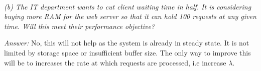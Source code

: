 \documentclass[12pt]{article}
\newenvironment{QandA}{\begin{enumerate}[label=\bfseries\alph*.]\bfseries}
                      {\end{enumerate}}
\newenvironment{answered}{\par\quad\normalfont}{}
\begin{document}
\begin{QandA}
\begin{answered}
    \ 
    
    \textit{(b) The IT department wants to cut client waiting time in half. It is considering buying more RAM for the web server so that it can hold 100 requests at any given time. Will this meet their performance objective?}
    
    \textit{Answer:} No, this will not help as the system is already in steady state. It is not limited by storage space or insufficient buffer size. The only way to improve this will be to increases the rate at which requests are processed, i.e increase $\lambda$.
    
    
    \end{answered}
    
    
\end{QandA}
\end{document}

